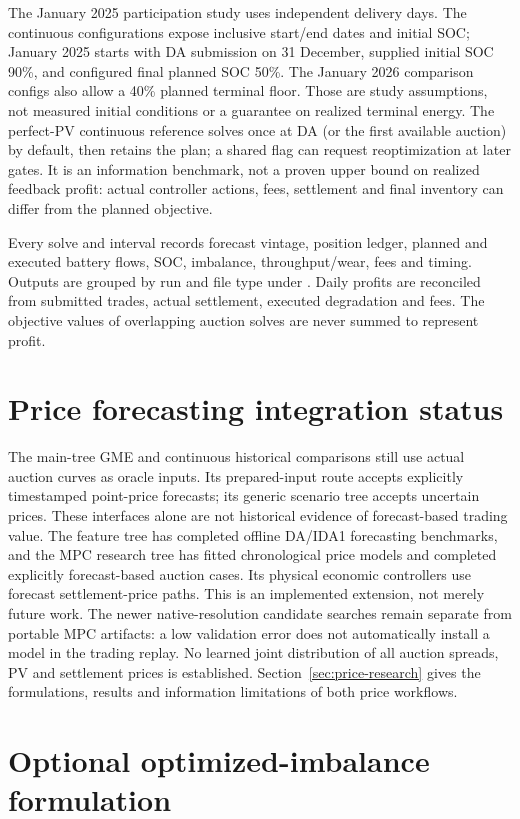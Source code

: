 \documentclass[11pt,a4paper]{article}
\begin{document}
The January 2025 participation study uses independent delivery days. The
continuous configurations expose inclusive start/end dates and initial SOC;
January 2025 starts with DA submission on 31 December, supplied initial SOC
90\%, and configured final planned SOC 50\%. The January 2026 comparison
configs also allow a 40\% planned terminal floor. Those are study assumptions,
not measured initial conditions or a guarantee on realized terminal energy.
The perfect-PV continuous reference solves once at DA (or the first available
auction) by default, then retains the plan; a shared flag can request
reoptimization at later gates. It is an information benchmark, not a proven
upper bound on realized feedback profit: actual controller actions, fees,
settlement and final inventory can differ from the planned objective.

Every solve and interval records forecast vintage, position ledger, planned
and executed battery flows, SOC, imbalance, throughput/wear, fees and timing.
Outputs are grouped by run and file type under . Daily profits
are reconciled from submitted trades, actual settlement, executed degradation
and fees. The objective values of overlapping auction solves are never summed
to represent profit.

\section{Price forecasting integration status}
The main-tree GME and continuous historical comparisons still use actual auction
curves as oracle inputs. Its prepared-input route accepts explicitly timestamped
point-price forecasts; its generic scenario tree accepts uncertain prices. These
interfaces alone are not historical evidence of forecast-based trading value.
The feature tree has completed offline DA/IDA1 forecasting benchmarks, and the
MPC research tree has fitted chronological price models and completed explicitly
forecast-based auction cases. Its physical economic controllers use forecast
settlement-price paths. This is an implemented extension, not merely future work.
The newer native-resolution candidate searches remain separate from portable
MPC artifacts: a low validation error does not automatically install a model in
the trading replay. No learned joint distribution of all auction spreads, PV and
settlement prices is established. Section~\ref{sec:price-research} gives the
formulations, results and information limitations of both price workflows.

\section{Optional optimized-imbalance formulation}
\end{document}
